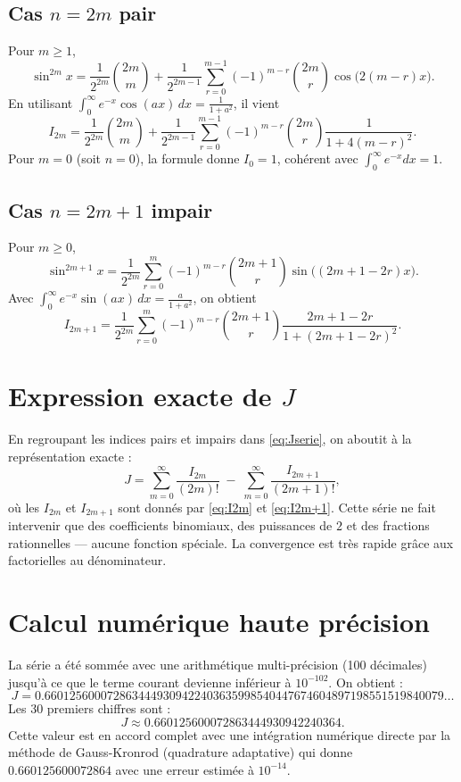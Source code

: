 \documentclass[a4paper,12pt]{article}
\begin{document}
\subsection{Cas \(n = 2m\) pair}
Pour \(m\ge 1\),
\[
\sin^{2m} x = \frac{1}{2^{2m}}\binom{2m}{m} 
+ \frac{1}{2^{2m-1}}\sum_{r=0}^{m-1} (-1)^{m-r}\binom{2m}{r}\cos\bigl(2(m-r)x\bigr).
\]
En utilisant \(\displaystyle \int_0^\infty e^{-x}\cos(ax)\,dx = \frac{1}{1+a^2}\), il vient
\begin{equation}\label{eq:I2m}
I_{2m} = \frac{1}{2^{2m}}\binom{2m}{m}
+ \frac{1}{2^{2m-1}}\sum_{r=0}^{m-1} (-1)^{m-r}\binom{2m}{r}
\frac{1}{1+4(m-r)^2}.
\end{equation}
Pour \(m=0\) (soit \(n=0\)), la formule donne \(I_0 = 1\), cohérent avec \(\int_0^\infty e^{-x}dx = 1\).

\subsection{Cas \(n = 2m+1\) impair}
Pour \(m\ge 0\),
\[
\sin^{2m+1} x = \frac{1}{2^{2m}}\sum_{r=0}^{m} (-1)^{m-r}\binom{2m+1}{r}
\sin\bigl((2m+1-2r)x\bigr).
\]
Avec \(\displaystyle \int_0^\infty e^{-x}\sin(ax)\,dx = \frac{a}{1+a^2}\), on obtient
\begin{equation}\label{eq:I2m+1}
I_{2m+1} = \frac{1}{2^{2m}}\sum_{r=0}^{m} (-1)^{m-r}\binom{2m+1}{r}
\frac{2m+1-2r}{1+(2m+1-2r)^2}.
\end{equation}

\section{Expression exacte de \(J\)}
En regroupant les indices pairs et impairs dans \eqref{eq:Jserie}, on aboutit à la représentation exacte :
\begin{equation}\label{eq:Jexact}
\boxed{
J = \sum_{m=0}^{\infty} \frac{I_{2m}}{(2m)!} \;-\; \sum_{m=0}^{\infty} \frac{I_{2m+1}}{(2m+1)!}
},
\end{equation}
où les \(I_{2m}\) et \(I_{2m+1}\) sont donnés par \eqref{eq:I2m} et \eqref{eq:I2m+1}. Cette série ne fait intervenir que des coefficients binomiaux, des puissances de \(2\) et des fractions rationnelles --- aucune fonction spéciale. La convergence est très rapide grâce aux factorielles au dénominateur.

\section{Calcul numérique haute précision}
La série a été sommée avec une arithmétique multi-précision (100 décimales) jusqu'à ce que le terme courant devienne inférieur à \(10^{-102}\). On obtient :
\begin{equation}
\boxed{
J = 0.6601256000728634449309422403635998540447674604897198551519840079\ldots
}
\end{equation}
Les 30 premiers chiffres sont :
\[
J \approx 0.660125600072863444930942240364.
\]
Cette valeur est en accord complet avec une intégration numérique directe par la méthode de Gauss-Kronrod (quadrature adaptative) qui donne \(0.660125600072864\) avec une erreur estimée à \(10^{-14}\).
\end{document}
